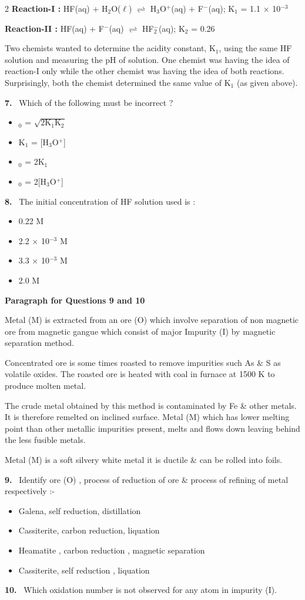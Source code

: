 \documentclass[10pt]{extarticle}
\newcommand{\qn}[1]{\par\smallskip\noindent\textbf{#1.}~}
\newcommand{\paraq}[2]{\par\smallskip\noindent\textbf{Paragraph for Questions #1 and #2}\par}
\newenvironment{qoptions}{\begin{itemize}[leftmargin=1.8em,itemsep=1pt,topsep=2pt,label={}]}{\end{itemize}}
\newcommand{\opt}[2]{\item[(#1)] #2}
\begin{document}
\begin{multicols}{2}
\textbf{Reaction-I :} HF(aq) + H$_2$O($\ell$) $\rightleftharpoons$ H$_3$O$^+$(aq) + F$^-$(aq); K$_1$ = 1.1 $\times$ 10$^{-3}$\par
\textbf{Reaction-II :} HF(aq) + F$^-$(aq) $\rightleftharpoons$ HF$_2^-$(aq); K$_2$ = 0.26\par
Two chemists wanted to determine the acidity constant, K$_1$, using the same HF solution and measuring the pH of solution. One chemist was having the idea of reaction-I only while the other chemist was having the idea of both reactions. Surprisingly, both the chemist determined the same value of K$_1$ (as given above).\par
\qn{7} Which of the following must be incorrect ?
\begin{qoptions}
\opt{A}{[HF]$_0$ = $\sqrt{2\text{K}_1\text{K}_2}$}
\opt{B}{K$_1$ = [H$_3$O$^+$]}
\opt{C}{[HF]$_0$ = 2K$_1$}
\opt{D}{[HF]$_0$ = 2[H$_3$O$^+$]}
\end{qoptions}
\qn{8} The initial concentration of HF solution used is :
\begin{qoptions}
\opt{A}{0.22 M}
\opt{B}{2.2 $\times$ 10$^{-3}$ M}
\opt{C}{3.3 $\times$ 10$^{-3}$ M}
\opt{D}{2.0 M}
\end{qoptions}
\paraq{9}{10}Metal (M) is extracted from an ore (O) which involve separation of non magnetic ore from magnetic gangue which consist of major Impurity (I) by magnetic separation method.\par
Concentrated ore is some times roasted to remove impurities such As \& S as volatile oxides. The roasted ore is heated with coal in furnace at 1500 K to produce molten metal.\par
The crude metal obtained by this method is contaminated by Fe \& other metals. It is therefore remelted on inclined surface. Metal (M) which has lower melting point than other metallic impurities present, melts and flows down leaving behind the less fusible metals.\par
Metal (M) is a soft silvery white metal it is ductile \& can be rolled into foils.\par
\qn{9} Identify ore (O) , process of reduction of ore \& process of refining of metal respectively :-
\begin{qoptions}
\opt{A}{Galena, self reduction, distillation}
\opt{B}{Cassiterite, carbon reduction, liquation}
\opt{C}{Heamatite , carbon reduction , magnetic separation}
\opt{D}{Cassiterite, self reduction , liquation}
\end{qoptions}
\qn{10} Which oxidation number is not observed for any atom in impurity (I).

\end{multicols}
\end{document}
